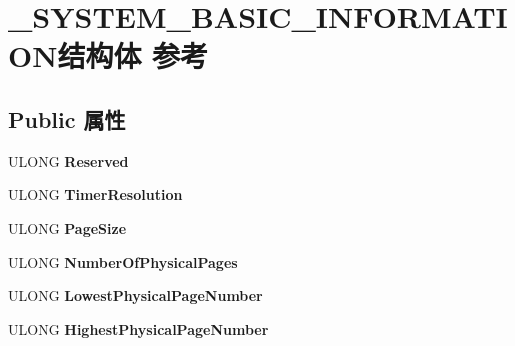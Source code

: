 \hypertarget{struct___s_y_s_t_e_m___b_a_s_i_c___i_n_f_o_r_m_a_t_i_o_n}{}\section{\+\_\+\+S\+Y\+S\+T\+E\+M\+\_\+\+B\+A\+S\+I\+C\+\_\+\+I\+N\+F\+O\+R\+M\+A\+T\+I\+O\+N结构体 参考}
\label{struct___s_y_s_t_e_m___b_a_s_i_c___i_n_f_o_r_m_a_t_i_o_n}
\subsection*{Public 属性}
\begin{DoxyCompactItemize}
\item 
\mbox{\label{struct___s_y_s_t_e_m___b_a_s_i_c___i_n_f_o_r_m_a_t_i_o_n_ab7d35660361085c82a5b68bd0748e746}} 
U\+L\+O\+NG {\bfseries Reserved}
\item 
\mbox{\label{struct___s_y_s_t_e_m___b_a_s_i_c___i_n_f_o_r_m_a_t_i_o_n_a6808a1c1257c9bc75cd65033ad9b97c1}} 
U\+L\+O\+NG {\bfseries Timer\+Resolution}
\item 
\mbox{\label{struct___s_y_s_t_e_m___b_a_s_i_c___i_n_f_o_r_m_a_t_i_o_n_a53946ff8cf0edd8651c56a4bb08c4fb9}} 
U\+L\+O\+NG {\bfseries Page\+Size}
\item 
\mbox{\label{struct___s_y_s_t_e_m___b_a_s_i_c___i_n_f_o_r_m_a_t_i_o_n_abb2fe3107a11376ba03e12f1379fe073}} 
U\+L\+O\+NG {\bfseries Number\+Of\+Physical\+Pages}
\item 
\mbox{\label{struct___s_y_s_t_e_m___b_a_s_i_c___i_n_f_o_r_m_a_t_i_o_n_a44f3e42a2f7be58150139df2e41082a7}} 
U\+L\+O\+NG {\bfseries Lowest\+Physical\+Page\+Number}
\item 
\mbox{\label{struct___s_y_s_t_e_m___b_a_s_i_c___i_n_f_o_r_m_a_t_i_o_n_a528070bdb02bbc3681d27a0aac4bbd02}} 
U\+L\+O\+NG {\bfseries Highest\+Physical\+Page\+Number}

\end{DoxyCompactItemize}
